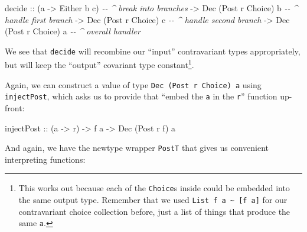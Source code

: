 \documentclass[]{article}
\newenvironment{Shaded}{}{}
\newcommand{\CommentTok}[1]{\textcolor[rgb]{0.38,0.63,0.69}{\textit{#1}}}
\newcommand{\DataTypeTok}[1]{\textcolor[rgb]{0.56,0.13,0.00}{#1}}
\newcommand{\NormalTok}[1]{#1}
\newcommand{\OtherTok}[1]{\textcolor[rgb]{0.00,0.44,0.13}{#1}}
\begin{document}
\begin{Shaded}
\begin{Highlighting}[]
\NormalTok{decide}
\OtherTok{    ::}\NormalTok{ (a }\OtherTok{{-}>} \DataTypeTok{Either}\NormalTok{ b c)        }\CommentTok{{-}{-} \^{} break into branches}
    \OtherTok{{-}>} \DataTypeTok{Dec}\NormalTok{ (}\DataTypeTok{Post}\NormalTok{ r }\DataTypeTok{Choice}\NormalTok{) b    }\CommentTok{{-}{-} \^{} handle first branch}
    \OtherTok{{-}>} \DataTypeTok{Dec}\NormalTok{ (}\DataTypeTok{Post}\NormalTok{ r }\DataTypeTok{Choice}\NormalTok{) c    }\CommentTok{{-}{-} \^{} handle second branch}
    \OtherTok{{-}>} \DataTypeTok{Dec}\NormalTok{ (}\DataTypeTok{Post}\NormalTok{ r }\DataTypeTok{Choice}\NormalTok{) a    }\CommentTok{{-}{-} \^{} overall handler}
\end{Highlighting}
\end{Shaded}

We see that \texttt{decide} will recombine our ``input'' contravariant types
appropriately, but will keep the ``output'' covariant type constant\footnote{This
  works out because each of the \texttt{Choice}s inside could be embedded into
  the same output type. Remember that we used
  \texttt{List\ f\ a\ \textasciitilde{}\ {[}f\ a{]}} for our contravariant
  choice collection before, just a list of things that produce the same
  \texttt{a}.}.

Again, we can construct a value of type \texttt{Dec\ (Post\ r\ Choice)\ a} using
\texttt{injectPost}, which asks us to provide that ``embed the \texttt{a} in the
\texttt{r}'' function up-front:

\begin{Shaded}
\begin{Highlighting}[]
\OtherTok{injectPost ::}\NormalTok{ (a }\OtherTok{{-}>}\NormalTok{ r) }\OtherTok{{-}>}\NormalTok{ f a }\OtherTok{{-}>} \DataTypeTok{Dec}\NormalTok{ (}\DataTypeTok{Post}\NormalTok{ r f) a}
\end{Highlighting}
\end{Shaded}

And again, we have the newtype wrapper \texttt{PostT} that gives us convenient
interpreting functions:
\end{document}
